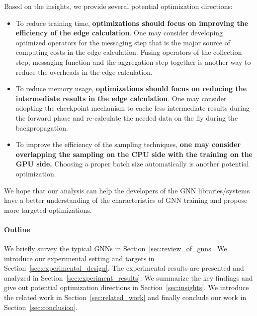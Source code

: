 Based on the insights, we provide several potential optimization directions:
\begin{itemize}
      \item To reduce training time, \textbf{optimizations should focus on improving the efficiency of the edge calculation}. 
      One may consider developing optimized operators for the messaging step that is the major source of computing costs in the edge calculation.
       Fusing operators of the collection step, messaging function and the aggregation step together is another way to reduce the overheads in the edge calculation.
      \item To reduce memory usage, \textbf{optimizations should focus on reducing the intermediate results in the edge calculation}. 
      One may consider adopting the checkpoint mechanism to cache less intermediate results during the forward phase and re-calculate the needed data on the fly during the backpropagation.
      \item To improve the efficiency of the sampling techniques, \textbf{one may consider overlapping the sampling on the CPU side with the training on the GPU side.} 
      Choosing a proper batch size automatically is another potential optimization.
\end{itemize}
We hope that our analysis can help the developers of the GNN libraries/systems have a better understanding of the characteristics of GNN training and propose more targeted optimizations.

\paragraph{Outline}
We briefly survey the typical GNNs in Section~\ref{sec:review_of_gnns}.
We introduce our experimental setting and targets in Section~\ref{sec:experimental_design}.
The experimental results are presented and analyzed in Section~\ref{sec:experiment_results}.
We summarize the key findings and give out potential optimization directions in Section~\ref{sec:insights}.
We introduce the related work in Section~\ref{sec:related_work} and finally conclude our work in Section~\ref{sec:conclusion}.
